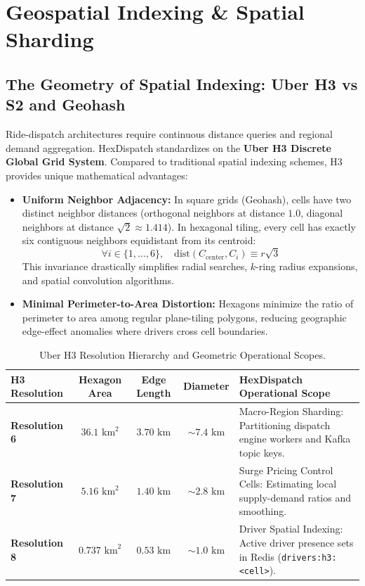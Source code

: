 \documentclass[11pt,a4paper]{article}
\begin{document}
\section{Geospatial Indexing \& Spatial Sharding}

\subsection{The Geometry of Spatial Indexing: Uber H3 vs S2 and Geohash}
Ride-dispatch architectures require continuous distance queries and regional demand aggregation. HexDispatch standardizes on the \textbf{Uber H3 Discrete Global Grid System}. Compared to traditional spatial indexing schemes, H3 provides unique mathematical advantages:
\begin{itemize}[leftmargin=1.5em]
    \item \textbf{Uniform Neighbor Adjacency:} In square grids (Geohash), cells have two distinct neighbor distances (orthogonal neighbors at distance $1.0$, diagonal neighbors at distance $\sqrt{2} \approx 1.414$). In hexagonal tiling, every cell has exactly six contiguous neighbors equidistant from its centroid:
    \begin{equation}
        \forall i \in \{1,\dots,6\}, \quad \text{dist}(C_{\text{center}}, C_i) \equiv r \sqrt{3}
    \end{equation}
    This invariance drastically simplifies radial searches, $k$-ring radius expansions, and spatial convolution algorithms.
    \item \textbf{Minimal Perimeter-to-Area Distortion:} Hexagons minimize the ratio of perimeter to area among regular plane-tiling polygons, reducing geographic edge-effect anomalies where drivers cross cell boundaries.
\end{itemize}

\begin{table}[htbp]
\centering
\small
\begin{tabular}{l c c c p{5.5cm}}
\toprule
\textbf{H3 Resolution} & \textbf{Hexagon Area} & \textbf{Edge Length} & \textbf{Diameter} & \textbf{HexDispatch Operational Scope} \\
\midrule
\textbf{Resolution 6} & $36.1\text{ km}^2$ & $3.70\text{ km}$ & $\sim 7.4\text{ km}$ & Macro-Region Sharding: Partitioning dispatch engine workers and Kafka topic keys. \\
\rowcolor{HexLightBg}
\textbf{Resolution 7} & $5.16\text{ km}^2$ & $1.40\text{ km}$ & $\sim 2.8\text{ km}$ & Surge Pricing Control Cells: Estimating local supply-demand ratios and smoothing. \\
\textbf{Resolution 8} & $0.737\text{ km}^2$ & $0.53\text{ km}$ & $\sim 1.0\text{ km}$ & Driver Spatial Indexing: Active driver presence sets in Redis (\texttt{drivers:h3:<cell>}). \\
\bottomrule
\end{tabular}
\caption{Uber H3 Resolution Hierarchy and Geometric Operational Scopes.}
\label{tab:h3_hierarchy}
\end{table}
\end{document}
